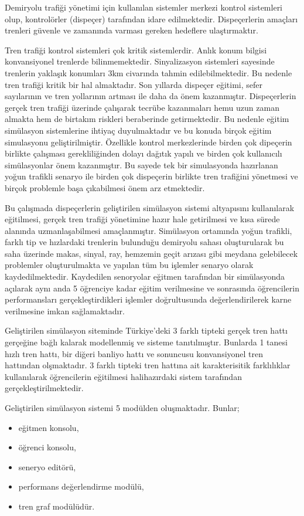 \documentclass[conference]{IEEEtran}
\begin{document}
Demiryolu trafiği yönetimi için kullanılan sistemler merkezi kontrol sistemleri olup, kontrolörler (dispeçer) tarafından idare edilmektedir.  Dispeçerlerin amaçları trenleri güvenle ve zamanında varması gereken hedeflere ulaştırmaktır.


Tren trafiği kontrol sistemleri çok kritik sistemlerdir. Anlık konum bilgisi konvansiyonel trenlerde bilinmemektedir. Sinyalizasyon sistemleri sayesinde trenlerin yaklaşık konumları 3km civarında tahmin edilebilmektedir. Bu nedenle tren trafiği kritik bir hal almaktadır. Son yıllarda dispeçer eğitimi, sefer sayılarının ve tren yollarının artması ile daha da önem kazanmıştır. Dispeçerlerin gerçek tren trafiği üzerinde çalışarak tecrübe kazanmaları hemu uzun zaman almakta hem de birtakım riskleri beraberinde getirmektedir. Bu nedenle eğitim simülasyon sistemlerine ihtiyaç duyulmaktadır ve bu konuda birçok eğitim simulasyonu geliştirilmiştir. Özellikle kontrol merkezlerinde birden çok dipeçerin birlikte çalışması gerekliliğinden dolayı dağıtık yapılı ve birden çok kullanıcılı simülasyonlar önem kazanmıştır. Bu sayede tek bir simulasyonda hazırlanan yoğun trafikli senaryo ile birden çok dispeçerin birlikte tren trafiğini yönetmesi ve birçok problemle başa çıkabilmesi önem arz etmektedir. 


Bu çalışmada dispeçerlerin geliştirilen simülasyon sistemi altyapısını kullanılarak eğitilmesi, gerçek tren trafiği yönetimine hazır hale getirilmesi ve kısa sürede alanında uzmanlaşabilmesi amaçlanmıştır. Simülasyon ortamında yoğun trafikli, farklı tip ve hızlardaki trenlerin bulunduğu demiryolu sahası oluşturularak bu saha üzerinde makas, sinyal, ray, hemzemin geçit arızası gibi meydana gelebilecek problemler oluşturulmakta ve yapılan tüm bu işlemler senaryo olarak kaydedilmektedir. Kaydedilen senoryolar eğitmen tarafından bir simülasyonda açılarak aynı anda 5 öğrenciye kadar eğitim verilmesine ve sonrasında öğrencilerin performansları gerçekleştirdikleri işlemler doğrultusunda değerlendirilerek karne verilmesine imkan sağlamaktadır.


Geliştirilen simülasyon siteminde Türkiye'deki 3 farklı tipteki gerçek tren hattı gerçeğine bağlı kalarak modellenmiş ve sisteme tanıtılmıştır. Bunlarda 1 tanesi hızlı tren hattı, bir diğeri banliyo hattı ve sonuncusu konvansiyonel tren hattından olşmaktadır. 3 farklı tipteki tren hattına ait karakterisitik farklılıklar kullanılarak öğrencilerin eğitilmesi halihazırdaki sistem tarafından gerçekleştirilmektedir.


Geliştirilen simülasyon sistemi 5 modülden oluşmaktadır. 
Bunlar; 
\begin{itemize}
\item eğitmen konsolu,
\item öğrenci konsolu, 
\item seneryo editörü,
\item performans değerlendirme modülü,
\item tren graf modülüdür. 
\end{itemize}
\end{document}

